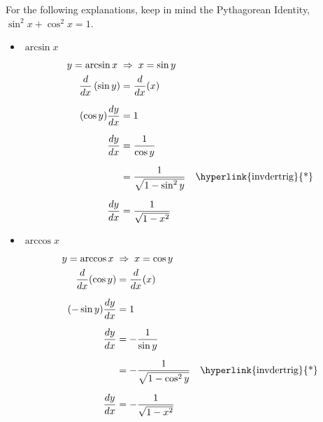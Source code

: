\documentclass[12pt]{article}
\begin{document}
For the following explanations, keep in mind the \hypertarget{invdertrig}{Pythagorean Identity}, $\sin^2{x} + \cos^2{x} = 1$.
\begin{itemize}
    \item $\arcsin{x}$
          \begin{align*}
              y = \arcsin{x} \;                   & \Rightarrow \; x = \sin{y}                                              \\
              \frac{d}{dx} \left( \sin{y} \right) & = \frac{d}{dx}(x)                                                       \\[6pt]
              (\cos{y}) \frac{dy}{dx}             & = 1                                                                     \\[6pt]
              \frac{dy}{dx}                       & = \frac{1}{\cos{y}}                                                     \\[6pt]
                                                  & = \frac{1}{\sqrt{1 - \sin^2{y}}} \quad \text{\hyperlink{invdertrig}{*}} \\[6pt]
              \frac{dy}{dx}                       & = \frac{1}{\sqrt{1 - x^2}}
          \end{align*}

    \item $\arccos{x}$
          \begin{align*}
              y = \arccos{x} \;        & \Rightarrow \; x = \cos{y}                                               \\
              \frac{d}{dx} (\cos{y})   & = \frac{d}{dx} (x)                                                       \\[6pt]
              (-\sin{y}) \frac{dy}{dx} & = 1                                                                      \\[6pt]
              \frac{dy}{dx}            & = -\frac{1}{\sin{y}}                                                     \\[6pt]
                                       & = -\frac{1}{\sqrt{1 - \cos^2{y}}} \quad \text{\hyperlink{invdertrig}{*}} \\[6pt]
              \frac{dy}{dx}            & = -\frac{1}{\sqrt{1 - x^2}}
          \end{align*}


\end{itemize}
\end{document}

